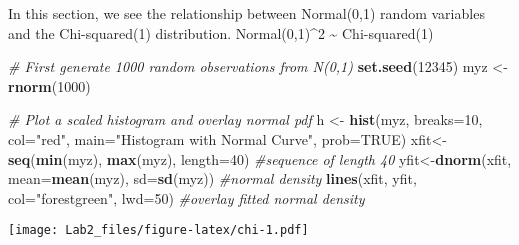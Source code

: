 \documentclass[
]{article}
\newenvironment{Shaded}{\begin{snugshade}}{\end{snugshade}}
\newcommand{\AttributeTok}[1]{\textcolor[rgb]{0.13,0.29,0.53}{#1}}
\newcommand{\CommentTok}[1]{\textcolor[rgb]{0.56,0.35,0.01}{\textit{#1}}}
\newcommand{\ConstantTok}[1]{\textcolor[rgb]{0.56,0.35,0.01}{#1}}
\newcommand{\DecValTok}[1]{\textcolor[rgb]{0.00,0.00,0.81}{#1}}
\newcommand{\FunctionTok}[1]{\textcolor[rgb]{0.13,0.29,0.53}{\textbf{#1}}}
\newcommand{\NormalTok}[1]{#1}
\newcommand{\OtherTok}[1]{\textcolor[rgb]{0.56,0.35,0.01}{#1}}
\newcommand{\StringTok}[1]{\textcolor[rgb]{0.31,0.60,0.02}{#1}}
\begin{document}
In this section, we see the relationship between Normal(0,1) random
variables and the Chi-squared(1) distribution. Normal(0,1)\^{}2
\textasciitilde{} Chi-squared(1)

\begin{Shaded}
\begin{Highlighting}[]
\CommentTok{\# First generate 1000 random observations from N(0,1)}
\FunctionTok{set.seed}\NormalTok{(}\DecValTok{12345}\NormalTok{)}
\NormalTok{myz }\OtherTok{\textless{}{-}} \FunctionTok{rnorm}\NormalTok{(}\DecValTok{1000}\NormalTok{)}

\CommentTok{\# Plot a scaled histogram and overlay normal pdf}
\NormalTok{h }\OtherTok{\textless{}{-}} \FunctionTok{hist}\NormalTok{(myz, }\AttributeTok{breaks=}\DecValTok{10}\NormalTok{, }\AttributeTok{col=}\StringTok{"red"}\NormalTok{, }
    \AttributeTok{main=}\StringTok{"Histogram with Normal Curve"}\NormalTok{, }\AttributeTok{prob=}\ConstantTok{TRUE}\NormalTok{) }
\NormalTok{xfit}\OtherTok{\textless{}{-}}\FunctionTok{seq}\NormalTok{(}\FunctionTok{min}\NormalTok{(myz), }\FunctionTok{max}\NormalTok{(myz), }\AttributeTok{length=}\DecValTok{40}\NormalTok{) }\CommentTok{\#sequence of length 40}
\NormalTok{yfit}\OtherTok{\textless{}{-}}\FunctionTok{dnorm}\NormalTok{(xfit, }\AttributeTok{mean=}\FunctionTok{mean}\NormalTok{(myz), }\AttributeTok{sd=}\FunctionTok{sd}\NormalTok{(myz)) }\CommentTok{\#normal density}
\FunctionTok{lines}\NormalTok{(xfit, yfit, }\AttributeTok{col=}\StringTok{"forestgreen"}\NormalTok{, }\AttributeTok{lwd=}\DecValTok{50}\NormalTok{) }\CommentTok{\#overlay fitted normal density}
\end{Highlighting}
\end{Shaded}

\texttt{[image: Lab2\_files/figure-latex/chi-1.pdf]}
\end{document}
